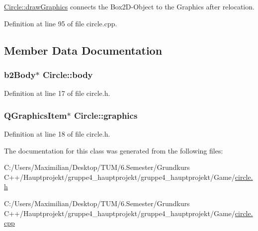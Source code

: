 \hyperlink{class_circle_a62401396510855dbb2e3a2fb3444c90a}{Circle\+::draw\+Graphics} connects the Box2\+D-\/\+Object to the Graphics after relocation. 



Definition at line 95 of file circle.\+cpp.



\subsection{Member Data Documentation}
\subsubsection[{\texorpdfstring{body}{body}}]{\setlength{\rightskip}{0pt plus 5cm}b2\+Body$\ast$ Circle\+::body}\hypertarget{class_circle_ac3736c952dbac0c813f6d98f29a3e34b}{}\label{class_circle_ac3736c952dbac0c813f6d98f29a3e34b}


Definition at line 17 of file circle.\+h.

\subsubsection[{\texorpdfstring{graphics}{graphics}}]{\setlength{\rightskip}{0pt plus 5cm}Q\+Graphics\+Item$\ast$ Circle\+::graphics}\hypertarget{class_circle_adcb606946696832caca242eafcc8322a}{}\label{class_circle_adcb606946696832caca242eafcc8322a}


Definition at line 18 of file circle.\+h.



The documentation for this class was generated from the following files\+:\begin{DoxyCompactItemize}
\item 
C\+:/\+Users/\+Maximilian/\+Desktop/\+T\+U\+M/6.\+Semester/\+Grundkurs C++/\+Hauptprojekt/gruppe4\+\_\+hauptprojekt/gruppe4\+\_\+hauptprojekt/\+Game/\hyperlink{circle_8h}{circle.\+h}\item 
C\+:/\+Users/\+Maximilian/\+Desktop/\+T\+U\+M/6.\+Semester/\+Grundkurs C++/\+Hauptprojekt/gruppe4\+\_\+hauptprojekt/gruppe4\+\_\+hauptprojekt/\+Game/\hyperlink{circle_8cpp}{circle.\+cpp}\end{DoxyCompactItemize}
